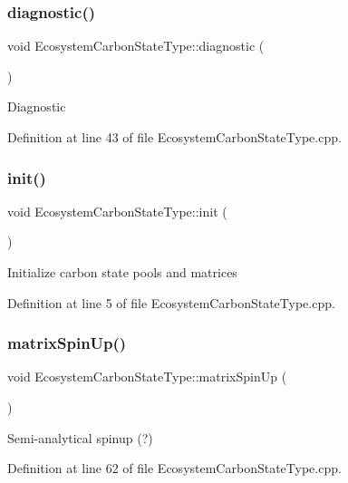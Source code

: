 \subsubsection{\texorpdfstring{diagnostic()}{diagnostic()}}
{\footnotesize\ttfamily void Ecosystem\+Carbon\+State\+Type\+::diagnostic (\begin{DoxyParamCaption}{ }\end{DoxyParamCaption})}

Diagnostic 

Definition at line 43 of file Ecosystem\+Carbon\+State\+Type.\+cpp.

\mbox{\label{class_ecosystem_carbon_state_type_af8446f966b95c51b061ac5199bd8bc26}} 
\subsubsection{\texorpdfstring{init()}{init()}}
{\footnotesize\ttfamily void Ecosystem\+Carbon\+State\+Type\+::init (\begin{DoxyParamCaption}{ }\end{DoxyParamCaption})}

Initialize carbon state pools and matrices 

Definition at line 5 of file Ecosystem\+Carbon\+State\+Type.\+cpp.

\mbox{\label{class_ecosystem_carbon_state_type_a9ea22da7d71c04e00dff17a4f225855a}} 
\subsubsection{\texorpdfstring{matrix\+Spin\+Up()}{matrixSpinUp()}}
{\footnotesize\ttfamily void Ecosystem\+Carbon\+State\+Type\+::matrix\+Spin\+Up (\begin{DoxyParamCaption}{ }\end{DoxyParamCaption})}

Semi-\/analytical spinup (?) 

Definition at line 62 of file Ecosystem\+Carbon\+State\+Type.\+cpp.

